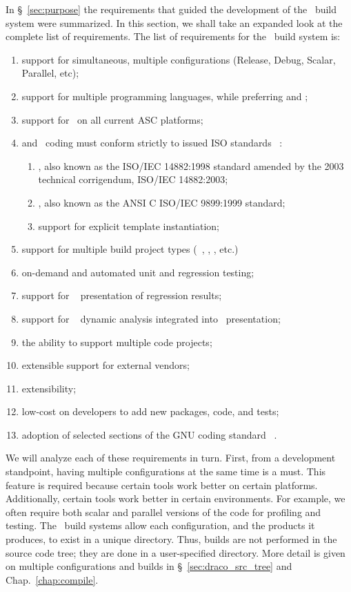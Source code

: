 In \S~\ref{sec:purpose} the requirements that guided the development
of the \draco\ build system were summarized.  In this section, we
shall take an expanded look at the complete list of requirements.  The
list of requirements for the \draco\ build system is:
%
\begin{enumerate}
\item support for simultaneous, multiple configurations (Release, Debug, Scalar, Parallel, etc);
\item support for multiple programming languages, while preferring  and \cpp;
\item support for \cpp\ on all current ASC platforms;
\item {} and \cpp\ coding must conform strictly to issued ISO standards~\cite{ansi:cpp} :
\begin{enumerate}
\item {}, also known as the ISO/IEC 14882:1998 standard amended by the 2003 technical corrigendum, ISO/IEC 14882:2003;
\item {}, also known as the ANSI C ISO/IEC 9899:1999 standard;
\item support for explicit template instantiation; 
\end{enumerate}
\item support for multiple build project types (~\cite{gmake}, , , etc.)
\item on-demand and automated unit and regression testing; 
\item support for \cdash~\cite{cmake,codercdash} presentation of regression results;
\item support for \valgrind~\cite{valgrind} dynamic analysis integrated into \cdash\ presentation; 
\item the ability to support multiple code projects;
\item extensible support for external vendors; 
\item extensibility;
\item low-cost on developers to add new packages, code, and tests; 
\item  adoption of selected sections of the GNU coding standard~\cite{gnu} .
\end{enumerate}
%
We will analyze each of these requirements in turn.  First, from a
development standpoint, having multiple configurations at the same
time is a must.  This feature is required because certain tools work
better on certain platforms.  Additionally, certain tools work better
in certain environments.  For example, we often require both scalar
and parallel versions of the code for profiling and testing.  The
\draco\ build systems allow each configuration, and the products it
produces, to exist in a unique directory.  Thus, builds are not
performed in the source code tree; they are done in a user-specified
directory.  More detail is given on multiple configurations and builds 
in \S~\ref{sec:draco_src_tree} and Chap.~\ref{chap:compile}.

